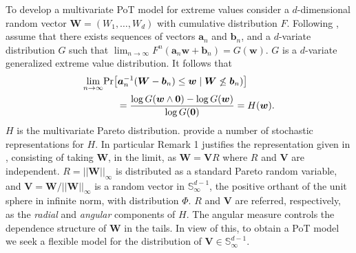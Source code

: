 
To develop a multivariate PoT model for extreme values consider a 
$d$-dimensional random vector $\bm{W} = (W_1, \ldots ,W_d)$ with
cumulative distribution $F$. Following \cite{RoSeWa2018a}, assume 
that there exists sequences of vectors $\bm{a}_n$ and $\bm{b}_n$,
and a $d$-variate distribution $G$ such that 
$\lim_{n\rightarrow\infty} F^n(\bm{a}_n \bm{w} + \bm{b}_n) = 
G(\bm{w})$. $G$ is a $d$-variate generalized extreme value 
distribution. It follows that
\begin{equation*}
    \begin{aligned}
    \lim\limits_{n\rightarrow\infty} &\prob{\bm{a}^{-1}_n (\bm{W} - \bm{b}_n) 
   \leq \bm{w} \mid \bm{W} \not\leq \bm{b}_n)} \\ 
     &\hspace{0.5cm}= \frac{\log G(\bm{w} \wedge \bm{0}) 
    - \log G(\bm{w}) }{\log G(\bm{0})} = H(\bm{w}).
    \end{aligned}
\end{equation*}
$H$ is the multivariate Pareto distribution. \cite{RoSeWa2018a}
provide a number of stochastic representations for $H$. In particular
Remark 1 justifies the representation given in \cite{ferreira2014},
consisting of taking $\bm{W}$, in the limit, as $\bm{W} = \bm{V}R$ 
where $R$ and $\bm{V}$ are independent. $R = ||\bm{W}||_\infty$ is 
distributed as a standard Pareto  random variable, and $\bm{V} = 
\bm{W}/||\bm{W}||_\infty$ is a random vector in  
$\mathbb{S}_{\infty}^{d-1}$, the positive orthant of the 
unit  sphere in infinite norm, with distribution $\Phi$. 
$R$ and $\bm{V}$ are referred, respectively, as the {\em radial} 
and {\em angular}  components of $H$. The angular measure controls 
the dependence  structure of $\bm{W}$  in the tails. In view of 
this, to obtain a  PoT model we seek a flexible model for the 
distribution of $\bm{V} \in {\mathbb S}_{\infty}^{d-1}$.

